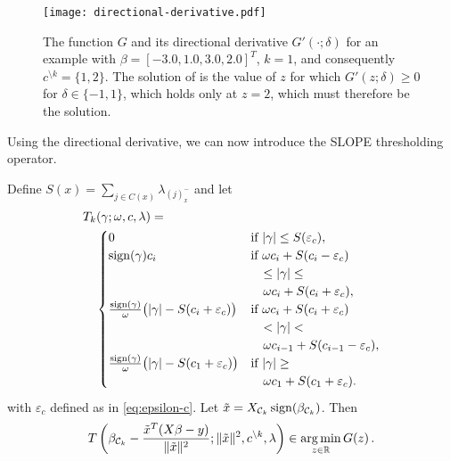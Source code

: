 \begin{figure}[htb]
  \centering
  \texttt{[image: directional-derivative.pdf]}
  \caption{%
  The function \(G\) and its directional derivative \(G'( \cdot ; \delta)\) for
  an example with \(\beta = [-3.0, 1.0, 3.0, 2.0]^T\), \(k = 1\), and consequently
  \(c^{\setminus k} = \{1, 2\}\). The solution of  is the value of \(z\) for
      which \(G'(z; \delta) \geq 0 \) for \(\delta \in \{-1, 1\}\), which holds only
      at \(z = 2\), which must therefore be the solution.
    }
  \label{fig:directional-derivative}
\end{figure}

Using the directional derivative, we can now introduce the SLOPE thresholding operator.

\begin{theorem}
  \label{thm:thresholding-operator}
  Define \(S(x) = \sum_{j \in C(x)}\lambda_{(j)^-_{x}}\) and
  let
  \[
    \begin{multlined}
      T_k(\gamma; \omega, c, \lambda) = \\
      \begin{cases}
        0
            & \text{if } |\gamma| \leq S(\varepsilon_c),               \\
        \sign(\gamma)c_i
            & \text{if } \omega c_i + S(c_i - \varepsilon_c)           \\
            & \quad \leq |\gamma| \leq                                 \\
            & \quad \omega c_i + S(c_i + \varepsilon_c),               \\
        \frac{\sign(\gamma)}{\omega} \big( |\gamma| - S(c_i + \varepsilon_c) \big)
            & \text{if } \omega c_i + S(c_i + {\varepsilon_c})         \\
            & \quad < |\gamma| <                                       \\
            & \quad \omega c_{i - 1} + S(c_{i - 1} - {\varepsilon_c}), \\
        \frac{\sign(\gamma)}{\omega} \big( |\gamma| - S(c_1 + {\varepsilon_c}) \big)
            & \text{if } |\gamma| \geq                                 \\
            & \quad \omega c_1 + S(c_1 + {\varepsilon_c}).
      \end{cases}
    \end{multlined}
  \]
  with \({\varepsilon_c}\) defined as in \eqref{eq:epsilon-c}.
  Let $\tilde x = X_{\mathcal{C}_k} \operatorname{sign}(\beta_{\mathcal{C}_k})$.
  Then
  \begin{equation}
    \begin{multlined}
      T \left(\beta_{\cC_k} - \frac{\tilde x^T(X\beta - y)}{\norm{\tilde x}^2} ; \Vert \tilde x \Vert^2, c^{\setminus k}, \lambda \right) \in \argmin_{z \in \mathbb{R}} G(z) \,.
    \end{multlined}
  \end{equation}
\end{theorem}

